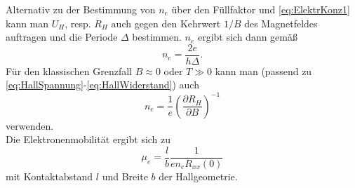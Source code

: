 Alternativ zu der Bestimmung von $n_e$ über den Füllfaktor und \autoref{eq:ElektrKonz1} kann man $U_H$, resp. $R_H$ auch gegen den Kehrwert $1/B$ des Magnetfeldes auftragen und die Periode
$\Delta$ bestimmen. $n_e$ ergibt sich dann gemäß
\begin{equation}\label{eq:ElektrKonz2}
n_e = \frac{2e}{h\Delta}.
\end{equation}
Für den klassischen Grenzfall $B\approx 0$ oder $T\gg0$ kann man (passend zu \eqref{eq:HallSpannung}-\eqref{eq:HallWiderstand}) auch
\begin{equation}\label{eq:ElektrKonz3}
n_e = \frac{1}{e}\left(\frac{\partial R_H}{\partial B}\right)^{-1}
\end{equation}
verwenden.\\
Die Elektronenmobilität ergibt sich zu
\begin{equation}\label{eq:Mobilitaet}
	\mu_e = \frac{l}{b}\frac{1}{e n_eR_{xx}(0)}
\end{equation}
mit Kontaktabstand $l$ und Breite $b$ der Hallgeometrie.
\nocite{qhe}
\nocite{wiki-fg}
\nocite{wiki-he}
